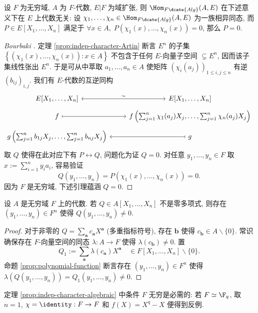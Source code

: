 \begin{theorem}\label{prop:indep-character-algebraic}
	设 $F$ 为无穷域, $A$ 为 $F$-代数, $E|F$ 为域扩张, 则 $\Hom_{F\dcate{Alg}}(A,E)$ 在下述意义下在 $E$ 上代数无关: 设 $\chi_1, \ldots, \chi_n \in \Hom_{F\dcate{Alg}}(A,E)$ 为一族相异同态, 而 $P \in E[X_1, \ldots, X_n]$ 满足于 $\forall x \in A, \; P(\chi_1(x), \ldots, \chi_n(x))=0$, 那么 $P=0$.
\end{theorem}
\begin{proof}[Bourbaki {\cite[V. \S 6.2]{Bou-Alg2}}]
	定理 \ref{prop:indep-character-Artin} 断言 $E^n$ 的子集 $\left\{ (\chi_1(x), \ldots, \chi_n(x)) : x \in A \right\}$ 不包含于任何 $E$-向量子空间 $\subsetneq E^n$, 因而该子集线性张出 $E^n$. 于是可从中萃取 $a_1, \ldots, a_n \in A$ 使矩阵 $(\chi_i(a_j))_{1 \leq i,j \leq n}$ 有逆 $(b_{ij})_{i,j}$. 我们有 $E$-代数的互逆同构
	\[ \begin{tikzcd}[row sep=tiny]
	E[X_1, \ldots, X_n] \arrow[leftrightarrow, r, "\sim"] & E[X_1, \ldots, X_n] \\
	f \arrow[mapsto, r] & f\left( \sum_{j=1}^n \chi_1(a_j) X_j, \ldots, \sum_{j=1}^n \chi_n(a_j) X_j \right) \\
	g\left( \sum_{j=1}^n b_{1j} X_j, \ldots, \sum_{j=1}^n b_{nj} X_j \right) & g \arrow[mapsto, l]
	\end{tikzcd}\]
	取 $Q$ 使得在此对应下有 $P \leftrightarrow Q$, 问题化为证 $Q=0$. 对任意 $y_1, \ldots, y_n \in F$ 取 $x := \sum_{i=1}^n y_i a_i$, 容易验证
	\[ Q(y_1, \ldots, y_n) = P(\chi_1(x), \ldots, \chi_n(x)) = 0. \]
	因为 $F$ 是无穷域, 下述引理蕴涵 $Q=0$.
\end{proof}

\begin{lemma}
	设 $A$ 是无穷域 $F$ 上的代数. 若 $Q \in A[X_1, \ldots, X_n]$ 不是零多项式, 则存在 $(y_1, \ldots, y_n) \in F^n$ 使得 $Q(y_1, \ldots, y_n) \neq 0$.
\end{lemma}
\begin{proof}
	对于非零的 $Q = \sum_{\bm{a}} c_{\bm{a}} X^{\bm{a}}$ (多重指标符号), 存在 $\bm{b}$ 使得 $c_{\bm{b}} \in A \smallsetminus \{0\}$. 常识确保存在 $F$-向量空间的同态 $\lambda: A \to F$ 使得 $\lambda(c_{\bm{b}}) \neq 0$. 置
	\[ Q_1 := \sum_{\bm{a}} \lambda(c_{\bm{a}}) X^{\bm{a}} \quad \in F[X_1, \ldots, X_n] \smallsetminus \{0\}. \]
	命题 \ref{prop:polynomial-function} 断言存在 $(y_1, \ldots, y_n) \in F^n$ 使得 $\lambda(Q(y_1, \ldots, y_n)) = Q_1(y_1, \ldots, y_n) \neq 0$.
\end{proof}
定理 \ref{prop:indep-character-algebraic} 中条件 $F$ 无穷是必需的: 若 $F \simeq \F_q$, 取 $n=1$, $\chi = \identity: F \to F$ 和 $f(X) = X^q - X$ 便得到反例.

